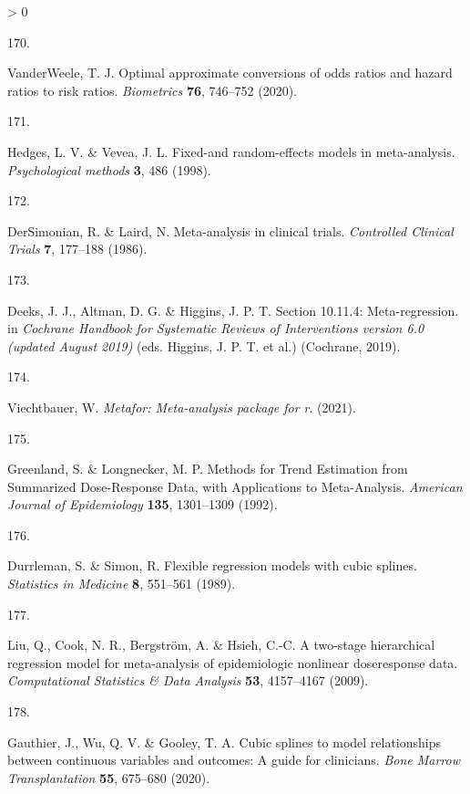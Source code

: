 \documentclass[a4paper, twoside]{templates/ociamthesis}
\newlength{\cslhangindent}
\newlength{\csllabelwidth}
\newenvironment{CSLReferences}[3] %
 {%
  \setlength{\parindent}{0pt}
  \ifodd #1 \everypar{\setlength{\hangindent}{\cslhangindent}}\ignorespaces\fi
  \ifnum #2 > 0
  \setlength{\parskip}{#2\baselineskip}
  \fi
 }%
 {}
\newcommand{\CSLLeftMargin}[1]{\parbox[t]{\maxof{\widthof{#1}}{\csllabelwidth}}{#1}}
\newcommand{\CSLRightInline}[1]{\parbox[t]{\linewidth - \csllabelwidth}{#1}}
\begin{document}
\begin{CSLReferences}{0}{0}
\leavevmode\hypertarget{ref-vanderweele2020}{}%
\CSLLeftMargin{170. }
\CSLRightInline{VanderWeele, T. J. Optimal approximate conversions of odds ratios and hazard ratios to risk ratios. \emph{Biometrics} \textbf{76}, 746--752 (2020).}

\leavevmode\hypertarget{ref-hedges1998}{}%
\CSLLeftMargin{171. }
\CSLRightInline{Hedges, L. V. \& Vevea, J. L. Fixed-and random-effects models in meta-analysis. \emph{Psychological methods} \textbf{3}, 486 (1998).}

\leavevmode\hypertarget{ref-dersimonian1986}{}%
\CSLLeftMargin{172. }
\CSLRightInline{DerSimonian, R. \& Laird, N. Meta-analysis in clinical trials. \emph{Controlled Clinical Trials} \textbf{7}, 177--188 (1986).}

\leavevmode\hypertarget{ref-deeks2019}{}%
\CSLLeftMargin{173. }
\CSLRightInline{Deeks, J. J., Altman, D. G. \& Higgins, J. P. T. Section 10.11.4: Meta-regression. in \emph{Cochrane {Handbook} for {Systematic Reviews} of {Interventions} version 6.0 (updated {August} 2019)} (eds. Higgins, J. P. T. et al.) ({Cochrane}, 2019).}

\leavevmode\hypertarget{ref-R-metafor}{}%
\CSLLeftMargin{174. }
\CSLRightInline{Viechtbauer, W. \emph{Metafor: Meta-analysis package for r}. (2021).}

\leavevmode\hypertarget{ref-greenland1992}{}%
\CSLLeftMargin{175. }
\CSLRightInline{Greenland, S. \& Longnecker, M. P. Methods for {Trend Estimation} from {Summarized Dose}-{Response Data}, with {Applications} to {Meta}-{Analysis}. \emph{American Journal of Epidemiology} \textbf{135}, 1301--1309 (1992).}

\leavevmode\hypertarget{ref-durrleman1989}{}%
\CSLLeftMargin{176. }
\CSLRightInline{Durrleman, S. \& Simon, R. Flexible regression models with cubic splines. \emph{Statistics in Medicine} \textbf{8}, 551--561 (1989).}

\leavevmode\hypertarget{ref-liu2009}{}%
\CSLLeftMargin{177. }
\CSLRightInline{Liu, Q., Cook, N. R., Bergström, A. \& Hsieh, C.-C. A two-stage hierarchical regression model for meta-analysis of epidemiologic nonlinear dose{}response data. \emph{Computational Statistics \& Data Analysis} \textbf{53}, 4157--4167 (2009).}

\leavevmode\hypertarget{ref-gauthier2020}{}%
\CSLLeftMargin{178. }
\CSLRightInline{Gauthier, J., Wu, Q. V. \& Gooley, T. A. Cubic splines to model relationships between continuous variables and outcomes: A guide for clinicians. \emph{Bone Marrow Transplantation} \textbf{55}, 675--680 (2020).}


\end{CSLReferences}
\end{document}
